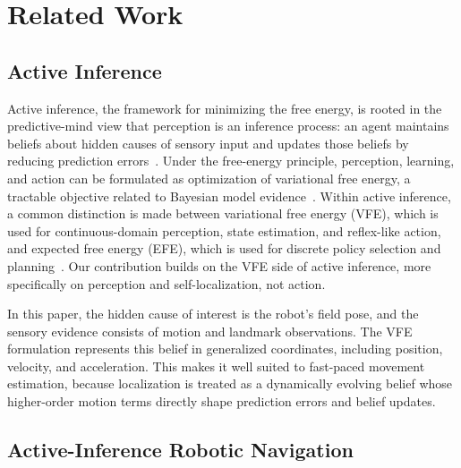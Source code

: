\section{Related Work}
\label{sec:related-work}

\subsection{Active Inference}
\label{subsec:related-active-inference-framing}

Active inference, the framework for minimizing the free energy, is rooted in the predictive-mind view that perception is an inference process: an agent maintains beliefs about hidden causes of sensory input and updates those beliefs by reducing prediction errors~\cite{hohwy_predictive_2013}. Under the free-energy principle, perception, learning, and action can be formulated as optimization of variational free energy, a tractable objective related to Bayesian model evidence~\cite{friston_free_2006,friston_free-energy_2009,friston_action_2010,friston_predictive_2009,parr_active_2022}. 
Within active inference, a common distinction is made between variational free energy (VFE), which is used for continuous-domain perception, state estimation, and reflex-like action, and expected free energy (EFE), which is used for discrete policy selection and planning~\cite{kaplan_planning_2018}. Our contribution builds on the VFE side of active inference, more specifically on perception and self-localization, not action.

In this paper, the hidden cause of interest is the robot's field pose, and the sensory evidence consists of motion and landmark observations. The VFE formulation represents this belief in generalized coordinates, including position, velocity, and acceleration. This makes it well suited to fast-paced movement estimation, because localization is treated as a dynamically evolving belief whose higher-order motion terms directly shape prediction errors and belief updates.

\subsection{Active-Inference Robotic Navigation}
\label{subsec:related-active-inference-navigation}

